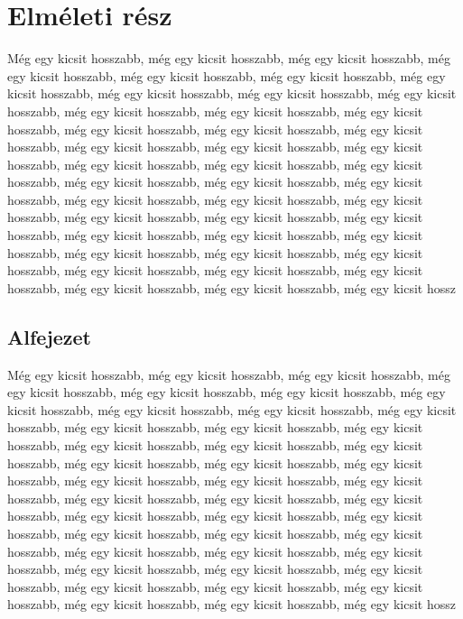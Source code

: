 \documentclass[a4paper,oneside,onecolumn,12pt]{LegrandOrangeBook}
\begin{document}
\chapter{Elméleti rész}

Még egy kicsit hosszabb, még egy kicsit hosszabb, még egy kicsit hosszabb, még egy kicsit hosszabb, még egy kicsit hosszabb, még egy kicsit hosszabb, még egy kicsit hosszabb, még egy kicsit hosszabb, még egy kicsit hosszabb, még egy kicsit hosszabb, még egy kicsit hosszabb, még egy kicsit hosszabb, még egy kicsit hosszabb, még egy kicsit hosszabb, még egy kicsit hosszabb, még egy kicsit hosszabb, még egy kicsit hosszabb, még egy kicsit hosszabb, még egy kicsit hosszabb, még egy kicsit hosszabb, még egy kicsit hosszabb, még egy kicsit hosszabb, még egy kicsit hosszabb, még egy kicsit hosszabb, még egy kicsit hosszabb, még egy kicsit hosszabb, még egy kicsit hosszabb, még egy kicsit hosszabb, még egy kicsit hosszabb, még egy kicsit hosszabb, még egy kicsit hosszabb, még egy kicsit hosszabb, még egy kicsit hosszabb, még egy kicsit hosszabb, még egy kicsit hosszabb, még egy kicsit hosszabb, még egy kicsit hosszabb, még egy kicsit hosszabb, még egy kicsit hosszabb, még egy kicsit hosszabb, még egy kicsit hosszabb, még egy kicsit hosszabb, még egy kicsit hossz

\section{Alfejezet}

Még egy kicsit hosszabb, még egy kicsit hosszabb, még egy kicsit hosszabb, még egy kicsit hosszabb, még egy kicsit hosszabb, még egy kicsit hosszabb, még egy kicsit hosszabb, még egy kicsit hosszabb, még egy kicsit hosszabb, még egy kicsit hosszabb, még egy kicsit hosszabb, még egy kicsit hosszabb, még egy kicsit hosszabb, még egy kicsit hosszabb, még egy kicsit hosszabb, még egy kicsit hosszabb, még egy kicsit hosszabb, még egy kicsit hosszabb, még egy kicsit hosszabb, még egy kicsit hosszabb, még egy kicsit hosszabb, még egy kicsit hosszabb, még egy kicsit hosszabb, még egy kicsit hosszabb, még egy kicsit hosszabb, még egy kicsit hosszabb, még egy kicsit hosszabb, még egy kicsit hosszabb, még egy kicsit hosszabb, még egy kicsit hosszabb, még egy kicsit hosszabb, még egy kicsit hosszabb, még egy kicsit hosszabb, még egy kicsit hosszabb, még egy kicsit hosszabb, még egy kicsit hosszabb, még egy kicsit hosszabb, még egy kicsit hosszabb, még egy kicsit hosszabb, még egy kicsit hosszabb, még egy kicsit hosszabb, még egy kicsit hosszabb, még egy kicsit hossz
\end{document}
